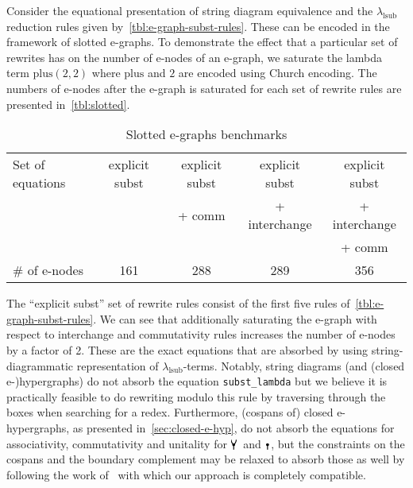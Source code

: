 Consider the equational presentation of string diagram equivalence and the $\lambda_{\text{lsub}}$ reduction rules given by~\autoref{tbl:e-graph-subst-rules}.
These can be encoded in the framework of slotted e-graphs.
To demonstrate the effect that a particular set of rewrites has on the number of e-nodes of an e-graph, we saturate the lambda term $\text{plus}(2, 2)$ where $\text{plus}$ and $2$ are encoded using Church encoding.
The numbers of e-nodes after the e-graph is saturated for each set of rewrite rules are presented in~\autoref{tbl:slotted}.

\begin{table}
	\begin{tabular}{lcccc}
		Set of equations & explicit subst & explicit subst & explicit subst & explicit subst \\
		                 &                & + comm         & + interchange  & + interchange  \\
		                 &                &                &                & + comm         \\
		\# of e-nodes    & 161            & 288            & 289            & 356
	\end{tabular}
	\caption{Slotted e-graphs benchmarks}
	\label{tbl:slotted}
\end{table}

The \enquote{explicit subst} set of rewrite rules consist of the first five rules of~\autoref{tbl:e-graph-subst-rules}.
We can see that additionally saturating the e-graph with respect to interchange and commutativity rules increases the number of e-nodes by a factor of 2.
These are the exact equations that are absorbed by using string-diagrammatic representation of $\lambda_{\text{lsub}}$-terms.
Notably, string diagrams (and (closed e-)hypergraphs) do not absorb the equation \texttt{subst\_lambda} but we believe it is practically feasible to do rewriting modulo this rule by traversing through the boxes when searching for a redex.
Furthermore, (cospans of) closed e-hypergraphs, as presented in~\autoref{sec:closed-e-hyp}, do not absorb the equations for associativity, commutativity and unitality for $\comonoid$ and $\counit$, but the constraints on the cospans and the boundary complement may be relaxed to absorb those as well by following the work of~\cite{zanassi_comonoid} with which our approach is completely compatible.

